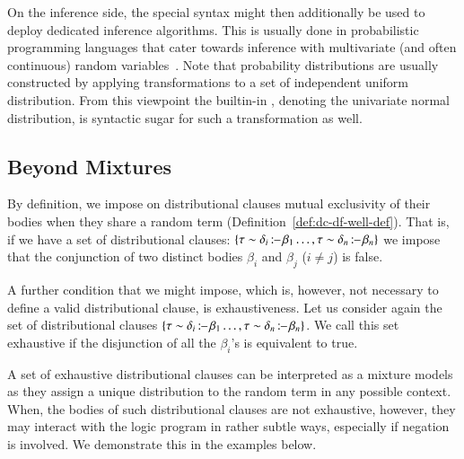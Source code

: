 On the inference side, the special syntax might then additionally be used to deploy dedicated inference algorithms. This is usually done in probabilistic programming languages that cater towards inference with multivariate (and often continuous) random variables~\citep{carpenter2017stan,bingham2019pyro}. Note that probability distributions are usually constructed by applying transformations to a set of independent uniform distribution. From this viewpoint the builtin-in , denoting the univariate normal distribution, is syntactic sugar for such a transformation as well.

















\subsection{Beyond Mixtures}\label{sec:non-mixture-dc}
\label{sec:beyondmixtures}

By definition, we impose on distributional clauses mutual exclusivity of their bodies when they share a random term (\cf Definition~\ref{def:dc-df-well-def}). That is, if we have a set of distributional clauses: $\{ \tau \sim \delta_i\operatorname*{\mathtt{{:}{\---}}} \beta_1 \dots, \tau \sim \delta_n\operatorname*{\mathtt{{:}{\---}}} \beta_n  \}$ we impose that the conjunction of two distinct bodies $\beta_i$ and $\beta_j$ ($i \neq j$) is false.

A further condition that we might impose, which is, however, not necessary to define a valid distributional clause, is exhaustiveness. Let us consider again the set of distributional clauses  $\{ \tau \sim \delta_i\operatorname*{\mathtt{{:}{\---}}} \beta_1 \dots, \tau \sim \delta_n\operatorname*{\mathtt{{:}{\---}}} \beta_n  \}$. We call this set exhaustive if the disjunction of all the $\beta_i$'s is equivalent to true.

A set of exhaustive distributional clauses can be interpreted as a mixture models as they assign a unique distribution to the random term in any possible context. When, the bodies of such distributional clauses are not exhaustive, however, they may
interact with the logic program in rather subtle ways, especially if negation is involved. We demonstrate this in the examples below.

